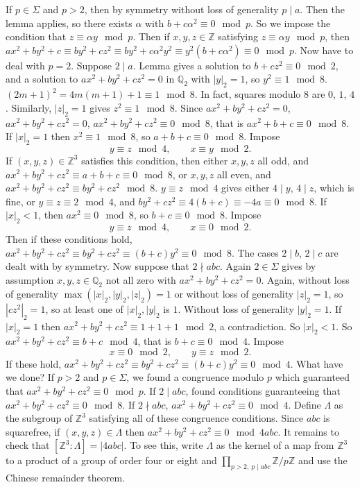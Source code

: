 \documentclass{article}
\newcommand{\Z}{\mathbb{Z}}
\newcommand{\Q}{\mathbb{Q}}
\newcommand{\rb}[1]{\left( #1 \right)}
\renewcommand{\sb}[1]{\left[ #1 \right]}
\newcommand{\abs}[1]{\left\lvert #1 \right\rvert}
\theoremstyle{definition}\newtheorem{definition}{Definition}[section]
\theoremstyle{definition}\newtheorem{remark}[definition]{Remark}
\theoremstyle{definition}\newtheorem*{example}{Example}
\theoremstyle{definition}\newtheorem*{note}{Note}
\begin{document}
If $ p \in \Sigma $ and $ p > 2 $, then by symmetry without loss of generality $ p \mid a $. Then the lemma applies, so there exists $ \alpha $ with $ b + c\alpha^2 \equiv 0 \mod p $. So we impose the condition that $ z \equiv \alpha y \mod p $. Then if $ x, y, z \in \Z $ satisfying $ z \equiv \alpha y \mod p $, then $ ax^2 + by^2 + c \equiv by^2 + cz^2 \equiv by^2 + c\alpha^2y^2 \equiv y^2\rb{b + c\alpha^2} \equiv 0 \mod p $. Now have to deal with $ p = 2 $. Suppose $ 2 \mid a $. Lemma gives a solution to $ b + cz^2 \equiv 0 \mod 2 $, and a solution to $ ax^2 + by^2 + cz^2 = 0 $ in $ \Q_2 $ with $ \abs{y}_2 = 1 $, so $ y^2 \equiv 1 \mod 8 $. $ \rb{2m + 1}^2 = 4m\rb{m + 1} + 1 \equiv 1 \mod 8 $. In fact, squares modulo $ 8 $ are $ 0 $, $ 1 $, $ 4 $. Similarly, $ \abs{z}_2 = 1 $ gives $ z^2 \equiv 1 \mod 8 $. Since $ ax^2 + by^2 + cz^2 = 0 $, $ ax^2 + by^2 + cz^2 = 0 $, $ ax^2 + by^2 + cz^2 \equiv 0 \mod 8 $, that is $ ax^2 + b + c \equiv 0 \mod 8 $. If $ \abs{x}_2 = 1 $ then $ x^2 \equiv 1 \mod 8 $, so $ a + b + c \equiv 0 \mod 8 $. Impose
$$ y \equiv z \mod 4, \qquad x \equiv y \mod 2. $$
If $ \rb{x, y, z} \in \Z^3 $ satisfies this condition, then either $ x, y, z $ all odd, and $ ax^2 + by^2 + cz^2 \equiv a + b + c \equiv 0 \mod 8 $, or $ x, y, z $ all even, and $ ax^2 + by^2 + cz^2 \equiv by^2 + cz^2 \mod 8 $. $ y \equiv z \mod 4 $ gives either $ 4 \mid y $, $ 4 \mid z $, which is fine, or $ y \equiv z \equiv 2 \mod 4 $, and $ by^2 + cz^2 \equiv 4\rb{b + c} \equiv -4a \equiv 0 \mod 8 $. If $ \abs{x}_2 < 1 $, then $ ax^2 \equiv 0 \mod 8 $, so $ b + c \equiv 0 \mod 8 $. Impose
$$ y \equiv z \mod 4, \qquad x \equiv 0 \mod 2. $$
Then if these conditions hold, $ ax^2 + by^2 + cz^2 \equiv by^2 + cz^2 \equiv \rb{b + c}y^2 \equiv 0 \mod 8 $. The cases $ 2 \mid b $, $ 2 \mid c $ are dealt with by symmetry. Now suppose that $ 2 \nmid abc $. Again $ 2 \in \Sigma $ gives by assumption $ x, y, z \in \Q_2 $ not all zero with $ ax^2 + by^2 + cz^2 = 0 $. Again, without loss of generality $ \max\rb{\abs{x}_2, \abs{y}_2, \abs{z}_2} = 1 $ or without loss of generality $ \abs{z}_2 = 1 $, so $ \abs{cz^2}_2 = 1 $, so at least one of $ \abs{x}_2, \abs{y}_2 $ is $ 1 $. Without loss of generality $ \abs{y}_2 = 1 $. If $ \abs{x}_2 = 1 $ then $ ax^2 + by^2 + cz^2 \equiv 1 + 1 + 1 \mod 2 $, a contradiction. So $ \abs{x}_2 < 1 $. So $ ax^2 + by^2 + cz^2 \equiv b + c \mod 4 $, that is $ b + c \equiv 0 \mod 4 $. Impose
$$ x \equiv 0 \mod 2, \qquad y \equiv z \mod 2. $$
If these hold, $ ax^2 + by^2 + cz^2 \equiv by^2 + cz^2 \equiv \rb{b + c}y^2 \equiv 0 \mod 4 $. What have we done? If $ p > 2 $ and $ p \in \Sigma $, we found a congruence modulo $ p $ which guaranteed that $ ax^2 + by^2 + cz^2 \equiv 0 \mod p $. If $ 2 \mid abc $, found conditions guaranteeing that $ ax^2 + by^2 + cz^2 \equiv 0 \mod 8 $. If $ 2 \nmid abc $, $ ax^2 + by^2 + cz^2 \equiv 0 \mod 4 $. Define $ \Lambda $ as the subgroup of $ \Z^3 $ satisfying all of these congruence conditions. Since $ abc $ is squarefree, if $ \rb{x, y, z} \in \Lambda $ then $ ax^2 + by^2 + cz^2 \equiv 0 \mod 4abc $. It remains to check that $ \sb{\Z^3 : \Lambda} = \abs{4abc} $. To see this, write $ \Lambda $ as the kernel of a map from $ \Z^3 $ to a product of a group of order four or eight and $ \prod_{p > 2, \ p \mid abc} \Z / p\Z $ and use the Chinese remainder theorem.
\end{document}
